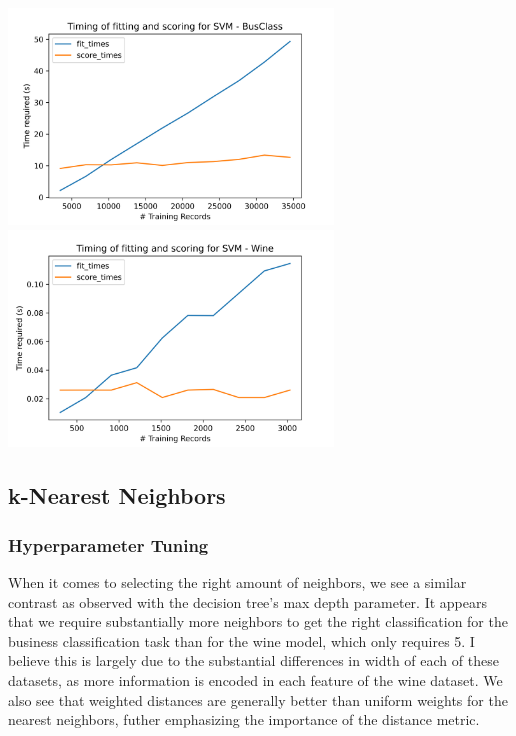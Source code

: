 \documentclass[
	letterpaper, %
]{jdf}
\begin{document}
\includegraphics[width=3.4in]{Figures/BusClass-0920/SVM/time_curve.png}
\includegraphics[width=3.4in]{Figures/Wine-0921/SVM/time_curve.png}


\subsection{k-Nearest Neighbors}

\subsubsection{Hyperparameter Tuning}

When it comes to selecting the right amount of neighbors, we see a similar contrast as observed with the decision tree's max depth parameter. It appears that we require substantially more neighbors to get the right classification for the business classification task than for the wine model, which only requires 5. I believe this is largely due to the substantial differences in width of each of these datasets, as more information is encoded in each feature of the wine dataset. We also see that weighted distances are generally better than uniform weights for the nearest neighbors, futher emphasizing the importance of the distance metric.
\end{document}
